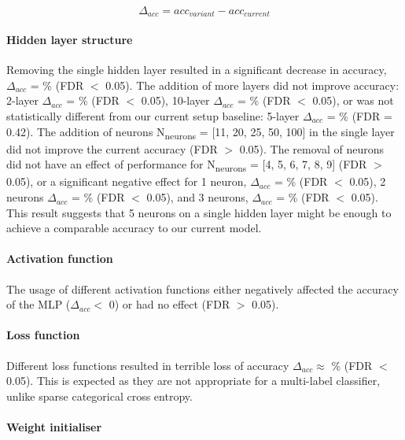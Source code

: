 \begin{equation}
\Delta_{acc} = acc_{variant} - acc_{current}
\label{eq:delta_accuracy}
\end{equation}

\paragraph{Hidden layer structure}

Removing the single hidden layer resulted in a significant decrease in accuracy, $\Delta_{acc}$ = \% (FDR $<$ 0.05). The addition of more layers did not improve accuracy: 2-layer  $\Delta_{acc}$ = \% (FDR $<$ 0.05), 10-layer $\Delta_{acc}$ = \% (FDR $<$ 0.05), or was not statistically different from our current setup baseline: 5-layer $\Delta_{acc}$ = \% (FDR = 0.42). The addition of neurons N\textsubscript{neurons} = [11, 20, 25, 50, 100] in the single layer did not improve the current accuracy (FDR $>$ 0.05). The removal of neurons did not have an effect of performance for N\textsubscript{neurons} = [4, 5, 6, 7, 8, 9] (FDR $>$ 0.05), or a significant negative effect for 1 neuron, $\Delta_{acc}$ = \% (FDR $<$ 0.05), 2 neurons $\Delta_{acc}$ = \% (FDR $<$ 0.05), and 3 neurons, $\Delta_{acc}$ = \% (FDR $<$ 0.05). This result suggests that 5 neurons on a single hidden layer might be enough to achieve a comparable accuracy to our current model.

\paragraph{Activation function}

The usage of different activation functions either negatively affected the accuracy of the MLP ($\Delta_{acc} <$ 0) or had no effect (FDR $>$ 0.05).

\paragraph{Loss function}

Different loss functions resulted in terrible loss of accuracy $\Delta_{acc} \approx$ \% (FDR $<$ 0.05). This is expected as they are not appropriate for a multi-label classifier, unlike sparse categorical cross entropy.

\paragraph{Weight initialiser}

